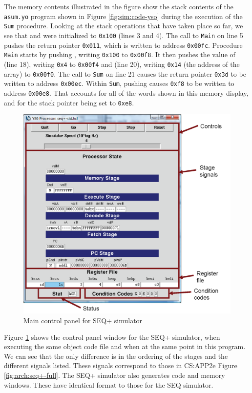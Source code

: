 \documentclass[11pt]{article}
\begin{document}
The memory contents illustrated in the figure show the stack contents
of the \texttt{asum.yo} program shown in Figure \ref{fig:sim:code-yso} during the
execution of the \texttt{Sum} procedure.  Looking at the stack
operations that have taken place so far, we see that \espreg{} and
\ebpreg{} were
initialized to \texttt{0x100} (lines 3 and 4).  The call to
\texttt{Main} on line 5 pushes the return pointer \texttt{0x011},
which is written to address \texttt{0x00fc}.  Procedure \texttt{Main}
starts by pushing \ebpreg{}, writing \texttt{0x100} to \texttt{0x00f8}.
It then pushes the value of \eaxreg{} (line 18), writing \texttt{0x4}
to \texttt{0x00f4} and \edxreg{} (line 20), writing \texttt{0x14} (the
address of the array) to \texttt{0x00f0}.  The call to \texttt{Sum} on
line 21 causes the return pointer \texttt{0x3d} to be written to
address \texttt{0x00ec}.  Within \texttt{Sum}, pushing \ebpreg{}
causes \texttt{0xf8} to be written to address \texttt{0x00e8}.
That accounts for all of the words shown
in this memory display, and for the stack pointer being set to \texttt{0xe8}.

\begin{figure}
\centerline{\includegraphics*[scale=0.8]{seq+-cntl.eps}}
\caption{Main control panel for SEQ+ simulator}
\label{fig:sim:seq+-cntl}
\end{figure}

Figure \ref{fig:sim:seq+-cntl} shows the control panel window for the
SEQ+ simulator, when executing the same object code file and when at
the same point in this program.  We can see that the only difference
is in the ordering of the stages and the different signals listed.
These signals correspond to those in CS:APP2e Figure
\ref{fig:arch:seq+-full}.  The SEQ+ simulator also generates code and
memory windows.  These have identical format to those for the SEQ simulator.
\end{document}
